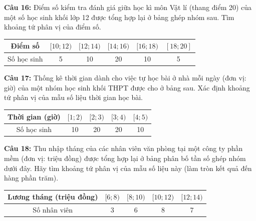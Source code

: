 \documentclass[12pt]{article}
\begin{document}
	\vspace{4mm}
	
	\noindent \textbf{Câu 16:} Điểm số kiểm tra đánh giá giữa học kì môn Vật lí (thang điểm 20) của một số học sinh khối lớp 12 được tổng hợp lại ở bảng ghép nhóm sau. Tìm khoảng tứ phân vị của điểm số.
	\begin{center}
		\renewcommand{\arraystretch}{1.3}
		\begin{tabular}{|c|c|c|c|c|c|}
			\hline
			Điểm số & $[10; 12)$ & $[12; 14)$ & $[14; 16)$ & $[16; 18)$ & $[18; 20]$ \\
			\hline
			Số học sinh & 5 & 10 & 20 & 10 & 5 \\
			\hline
		\end{tabular}
	\end{center}
	
	\vspace{4mm}
	
	\noindent \textbf{Câu 17:} Thống kê thời gian dành cho việc tự học bài ở nhà mỗi ngày (đơn vị: giờ) của một nhóm học sinh khối THPT được cho ở bảng sau. Xác định khoảng tứ phân vị của mẫu số liệu thời gian học bài.
	\begin{center}
		\renewcommand{\arraystretch}{1.3}
		\begin{tabular}{|c|c|c|c|c|}
			\hline
			Thời gian (giờ) & $[1; 2)$ & $[2; 3)$ & $[3; 4)$ & $[4; 5)$ \\
			\hline
			Số học sinh & 10 & 20 & 20 & 10 \\
			\hline
		\end{tabular}
	\end{center}
	
	\vspace{4mm}
	
	\noindent \textbf{Câu 18:} Thu nhập tháng của các nhân viên văn phòng tại một công ty phần mềm (đơn vị: triệu đồng) được tổng hợp lại ở bảng phân bố tần số ghép nhóm dưới đây. Hãy tìm khoảng tứ phân vị của mẫu số liệu này (làm tròn kết quả đến hàng phần trăm).
	\begin{center}
		\renewcommand{\arraystretch}{1.3}
		\begin{tabular}{|c|c|c|c|c|}
			\hline
			Lương tháng (triệu đồng) & $[6; 8)$ & $[8; 10)$ & $[10; 12)$ & $[12; 14)$ \\
			\hline
			Số nhân viên & 3 & 6 & 8 & 7 \\
			\hline
		\end{tabular}
	\end{center}
	
	\vspace{4mm}
	
\end{document}
